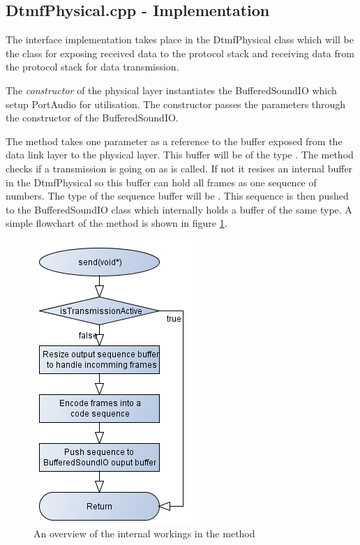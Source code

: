 	\subsection{DtmfPhysical.cpp - Implementation}
	The interface implementation takes place in the DtmfPhysical class which will be the class for exposing received data to the protocol stack
	and receiving data from the protocol stack for data transmission.
	
	The \textit{constructor} of the physical layer instantiates the BufferedSoundIO which setup PortAudio for utilisation. The constructor passes the
	parameters through the constructor of the BufferedSoundIO.
	
	The  method takes one parameter as a reference to the buffer exposed from the data link layer to the physical layer. This buffer
	will be of the type . The  method checks if a transmission is going on as  is called.
	If not it resises an internal buffer in the DtmfPhysical so this buffer can hold all frames as one sequence of numbers. The type of 
	the sequence buffer will be . This sequence is then pushed to the BufferedSoundIO class which
	internally holds a buffer of the same type. A simple flowchart of the  method is shown in figure \ref{fig:physical_send}.
	
	\begin{figure}[htb]
		\begin{center}
		\includegraphics[scale=0.7,trim=0 0 0 0]{content/graphics/physical/physical_send.png}%
		\caption{An overview of the internal workings in the  method}
		\label{fig:physical_send}
		\end{center}
	\end{figure}
	
